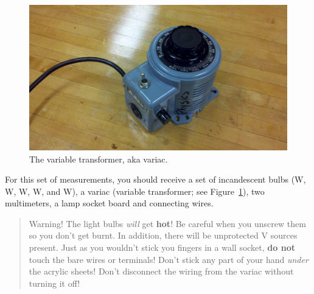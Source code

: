 \documentclass[12pt]{article}
\begin{document}
\begin{figure}
  \centering
  \includegraphics[width=2\textwidth/3]{figures/variac}
  \caption{The variable transformer, aka variac.}
  \label{fig:variac}
\end{figure}
For this set of measurements, you should receive a set of incandescent
bulbs (\unit[25]{W}, \unit[40]{W}, \unit[60]{W}, \unit[75]{W}, and
\unit[100]{W}), a variac (variable transformer; see
Figure~\ref{fig:variac}), two multimeters, a lamp socket board and
connecting wires.
\begin{quote}
  Warning!  The light bulbs \textit{will} get \textbf{hot}!  Be
  careful when you unscrew them so you don't get burnt.  In addition,
  there will be unprotected \unit[120]{V} sources present.  Just as
  you wouldn't stick you fingers in a wall socket, \textbf{do not}
  touch the bare wires or terminals!  Don't stick any part of your
  hand \textit{under} the acrylic sheets!  Don't disconnect the wiring
  from the variac without turning it off!
\end{quote}
\end{document}
